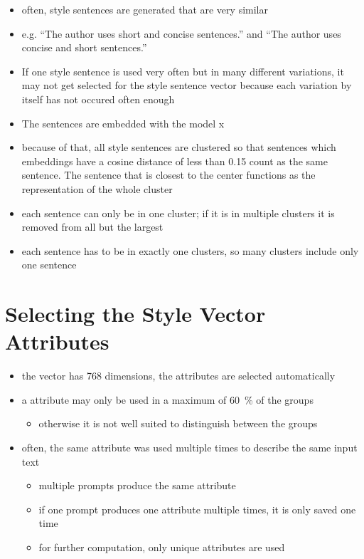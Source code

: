 \begin{itemize}
  \item often, style sentences are generated that are very similar
  \item e.g. \enquote{The author uses short and concise sentences.} and \enquote{The author uses concise and short sentences.}
  \item If one style sentence is used very often but in many different variations, it may not get selected for the style sentence vector because each variation by itself has not occured often enough
  \item The sentences are embedded with the model x %
  \item because of that, all style sentences are clustered so that sentences which embeddings have a cosine distance of less than 0.15 count as the same sentence. The sentence that is closest to the center functions as the representation of the whole cluster
  \item each sentence can only be in one cluster; if it is in multiple clusters it is removed from all but the largest
  \item each sentence has to be in exactly one clusters, so many clusters include only one sentence
\end{itemize}


\section{Selecting the Style Vector Attributes}
\label{sec:approach:selection}

\begin{itemize}
  \item the vector has 768 dimensions, the attributes are selected automatically
  \item a attribute may only be used in a maximum of \SI{60}{\percent} of the groups
        \begin{itemize}
          \item otherwise it is not well suited to distinguish between the groups
        \end{itemize}
  \item often, the same attribute was used multiple times to describe the same input text
        \begin{itemize}
          \item multiple prompts produce the same attribute
          \item if one prompt produces one attribute multiple times, it is only saved one time
          \item for further computation, only unique attributes are used
        \end{itemize}
\end{itemize}


